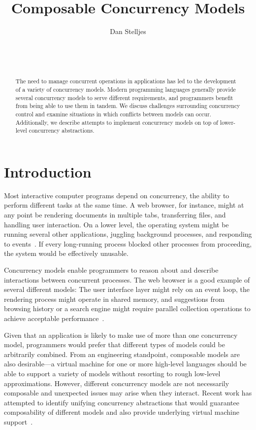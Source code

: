 \documentclass{sig-alternate}
\author{
\alignauthor{}
Dan Stelljes\\
  \affaddr{Division of Science and Mathematics}\\
  \affaddr{University of Minnesota, Morris}\\
  \affaddr{Morris, Minnesota, USA 56267}\\
  \email{stell124@morris.umn.edu}
}
\title{Composable Concurrency Models}
\begin{document}
\maketitle

\begin{abstract}

The need to manage concurrent operations in applications has led to the development of a variety of concurrency models. Modern programming languages generally provide several concurrency models to serve different requirements, and programmers benefit from being able to use them in tandem. We discuss challenges surrounding concurrency control and examine situations in which conflicts between models can occur. Additionally, we describe attempts to implement concurrency models on top of lower-level concurrency abstractions.

\end{abstract}


\section{Introduction}

Most interactive computer programs depend on concurrency, the ability to perform different tasks at the same time. A web browser, for instance, might at any point be rendering documents in multiple tabs, transferring files, and handling user interaction. On a lower level, the operating system might be running several other applications, juggling background processes, and responding to events~\cite{Swalens2014}. If every long-running process blocked other processes from proceeding, the system would be effectively unusable.

Concurrency models enable programmers to reason about and describe interactions between concurrent processes. The web browser is a good example of several different models: The user interface layer might rely on an event loop, the rendering process might operate in shared memory, and suggestions from browsing history or a search engine might require parallel collection operations to achieve acceptable performance~\cite{Marr2012}.

Given that an application is likely to make use of more than one concurrency model, programmers would prefer that different types of models could be arbitrarily combined. From an engineering standpoint, composable models are also desir\-able---a virtual machine for one or more high-level languages should be able to support a variety of models without resorting to rough low-level approximations. However, different concurrency models are not necessarily composable and unexpected issues may arise when they interact. Recent work has attempted to identify unifying concurrency abstractions that would guarantee composability of different models and also provide underlying virtual machine support~\cite{Marr2009, Marr2012, Swalens2014, Ziv2015}.
\end{document}
